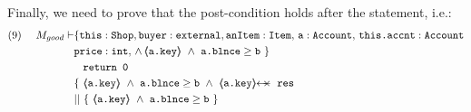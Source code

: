 \begin{proofO}
Finally, we need to prove that the post-condition holds after the  statement, i.e.:
\small
\begin{align*}
\text{(9)}  \ \ \ \ M_{good} \vdash & \{  \prg{this}:\prg{Shop}, \prg{buyer} : \prg{external}, \prg{anItem} : \prg{Item},\, \prg{a}:\prg{Account},\, \prg{this.accnt}:\prg{Account}\\
				& \prg{price} : \prg{int},\,
				  \wedge\, 
				  \inside{\prg{a.key}}\ \wedge\ {\prg{a.blnce} \geq \prg{b}}\ \}\\
		  		&\;\;\; \prg{return 0}\ \\  
		& \{\ {\inside{\prg{a.key}}\ \wedge\ {\prg{a.blnce} \geq \prg{b}}}\ 
		\wedge\ {\protectedFrom{\prg{a.key}}{\prg{res}}}\ \\
		& ||\ \{\ {\inside{\prg{a.key}}\ \wedge\ 
							 {\prg{a.blnce} \geq \prg{b}}}\ \}
\end{align*}
\normalsize
{}



\end{proofO}

